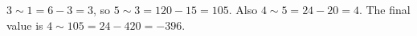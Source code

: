 $3\sim1=6-3=3$, so $5\sim3=120-15=105$. Also $4\sim5=24-20=4$. The final value is $4\sim105=24-420=\boxed{-396}$.
